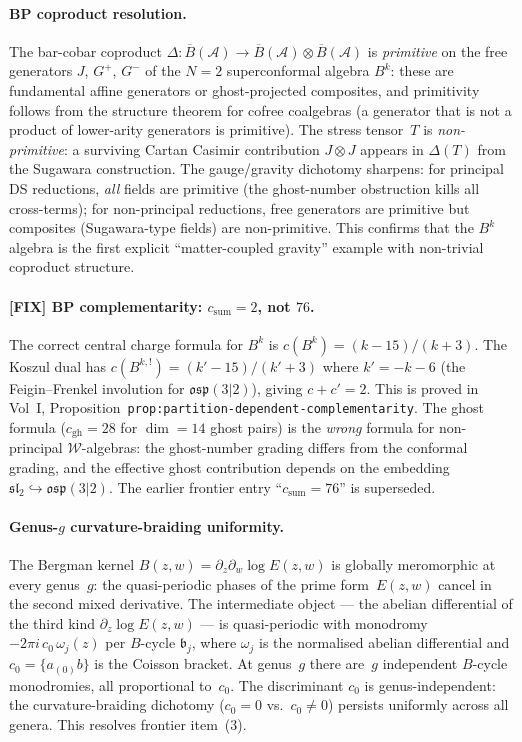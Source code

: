 \documentclass[11pt]{article}
\newcommand{\cA}{\mathcal{A}}
\newcommand{\cW}{\mathcal{W}}
\newcommand{\barB}{\overline{B}}
\begin{document}
\paragraph{BP coproduct resolution.}
The bar-cobar coproduct $\Delta\colon \barB(\cA) \to
\barB(\cA) \otimes \barB(\cA)$ is \emph{primitive} on the free
generators $J$, $G^+$, $G^-$ of the $N=2$ superconformal algebra
$B^k$: these are fundamental affine generators or ghost-projected
composites, and primitivity follows from the structure theorem
for cofree coalgebras (a generator that is not a product of
lower-arity generators is primitive).  The stress tensor~$T$
is \emph{non-primitive}: a surviving Cartan Casimir contribution
$J \otimes J$ appears in $\Delta(T)$ from the Sugawara construction.
The gauge/gravity dichotomy sharpens: for principal DS reductions,
\emph{all} fields are primitive (the ghost-number obstruction kills
all cross-terms); for non-principal reductions, free generators are
primitive but composites (Sugawara-type fields) are non-primitive.
This confirms that the $B^k$ algebra is the first explicit
``matter-coupled gravity'' example with non-trivial coproduct
structure.

\paragraph{{\bfseries [FIX]} BP complementarity: $c_{\mathrm{sum}} = 2$,
not $76$.}
The correct central charge formula for $B^k$ is
$c(B^k) = (k - 15)/(k + 3)$.  The Koszul dual has
$c(B^{k,!}) = (k' - 15)/(k' + 3)$ where $k' = -k - 6$
(the Feigin--Frenkel involution for $\mathfrak{osp}(3|2)$),
giving $c + c' = 2$.  This is proved in Vol~I,
Proposition~\texttt{prop:partition-dependent-complementarity}.
The ghost formula ($c_{\mathrm{gh}} = 28$ for $\dim = 14$ ghost
pairs) is the \emph{wrong} formula for non-principal $\cW$-algebras:
the ghost-number grading differs from the conformal grading, and the
effective ghost contribution depends on the embedding
$\mathfrak{sl}_2 \hookrightarrow \mathfrak{osp}(3|2)$.
The earlier frontier entry ``$c_{\mathrm{sum}} = 76$'' is superseded.

\paragraph{Genus-$g$ curvature-braiding uniformity.}
The Bergman kernel $B(z,w) = \partial_z \partial_w \log E(z,w)$ is
globally meromorphic at every genus~$g$: the quasi-periodic phases of
the prime form~$E(z,w)$ cancel in the second mixed derivative.  The
intermediate object --- the abelian differential of the third kind
$\partial_z \log E(z,w)$ --- is quasi-periodic with monodromy
$-2\pi i \, c_0 \, \omega_j(z)$ per $B$-cycle $\mathfrak{b}_j$,
where $\omega_j$ is the normalised abelian differential and $c_0 =
\{a_{(0)}b\}$ is the Coisson bracket.  At genus~$g$ there are~$g$
independent $B$-cycle monodromies, all proportional to~$c_0$.  The
discriminant $c_0$ is genus-independent: the curvature-braiding
dichotomy ($c_0 = 0$ vs.\ $c_0 \ne 0$) persists uniformly across all
genera.  This resolves frontier item~(3).
\end{document}
